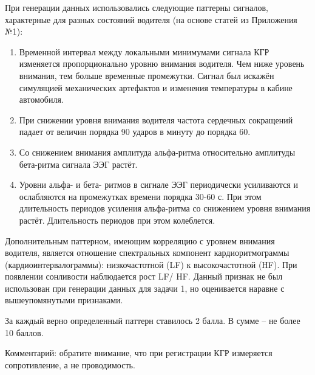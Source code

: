 \solutionSection

При генерации данных использовались следующие паттерны сигналов, характерные для разных состояний водителя (на основе статей из Приложения №1):
\begin{enumerate}
\item Временной интервал между локальными минимумами сигнала КГР изменяется пропорционально уровню внимания водителя. Чем ниже уровень внимания, тем больше временные промежутки. Сигнал был искажён симуляцией механических артефактов и изменения температуры в кабине автомобиля.
\item При снижении уровня внимания водителя частота сердечных сокращений падает от величин порядка 90 ударов в минуту до порядка 60.
\item Со снижением внимания амплитуда альфа-ритма относительно амплитуды бета-ритма сигнала ЭЭГ растёт.
\item Уровни альфа- и бета- ритмов в сигнале ЭЭГ периодически усиливаются и ослабляются на промежутках времени порядка 30-60 с. При этом длительность периодов усиления альфа-ритма со снижением уровня внимания растёт. Длительность периодов при этом колеблется.
\end{enumerate}

Дополнительным паттерном, имеющим корреляцию с уровнем внимания водителя, является отношение спектральных компонент кардиоритмограммы (кардиоинтервалограммы): низкочастотной (LF) к высокочастотной (HF). При появлении сонливости наблюдается рост LF/ HF. 
Данный признак не был использован при генерации данных для задачи 1, но оценивается наравне с вышеупомянутыми признаками.

За каждый верно определенный паттерн ставилось 2 балла. В сумме – не более 10 баллов.

Комментарий: обратите внимание, что при регистрации КГР измеряется сопротивление, а не проводимость.

